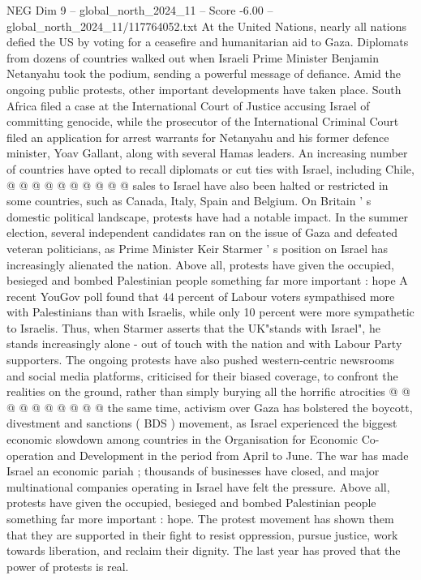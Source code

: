 \begin{textsample}{NEG Dim 9 – global\_north\_2024\_11 – Score -6.00 – global\_north\_2024\_11/117764052.txt}
At the United Nations, nearly all nations defied the US by voting for a ceasefire and humanitarian aid to Gaza.
Diplomats from dozens of countries walked out when Israeli Prime Minister Benjamin Netanyahu took the podium, sending a powerful message of defiance.
Amid the ongoing public protests, other important developments have taken place.
South Africa filed a case at the International Court of Justice accusing Israel of committing genocide, while the prosecutor of the International Criminal Court filed an application for arrest warrants for Netanyahu and his former defence minister, Yoav Gallant, along with several Hamas leaders.
An increasing number of countries have opted to recall diplomats or cut ties with Israel, including Chile, @ @ @ @ @ @ @ @ @ @ sales to Israel have also been halted or restricted in some countries, such as Canada, Italy, Spain and Belgium.
On Britain ' s domestic political landscape, protests have had a notable impact.
In the summer election, several independent candidates ran on the issue of Gaza and defeated veteran politicians, as Prime Minister Keir Starmer ' s position on Israel has increasingly alienated the nation.
Above all, protests have given the occupied, besieged and bombed Palestinian people something far more important : hope A recent YouGov poll found that 44 percent of Labour voters sympathised more with Palestinians than with Israelis, while only 10 percent were more sympathetic to Israelis.
Thus, when Starmer asserts that the UK"stands with Israel", he stands increasingly alone - out of touch with the nation and with Labour Party supporters.
The ongoing protests have also pushed western-centric newsrooms and social media platforms, criticised for their biased coverage, to confront the realities on the ground, rather than simply burying all the horrific atrocities @ @ @ @ @ @ @ @ @ @ the same time, activism over Gaza has bolstered the boycott, divestment and sanctions ( BDS ) movement, as Israel experienced the biggest economic slowdown among countries in the Organisation for Economic Co-operation and Development in the period from April to June.
The war has made Israel an economic pariah ; thousands of businesses have closed, and major multinational companies operating in Israel have felt the pressure.
Above all, protests have given the occupied, besieged and bombed Palestinian people something far more important : hope.
The protest movement has shown them that they are supported in their fight to resist oppression, pursue justice, work towards liberation, and reclaim their dignity.
The last year has proved that the power of protests is real.

\end{textsample}
